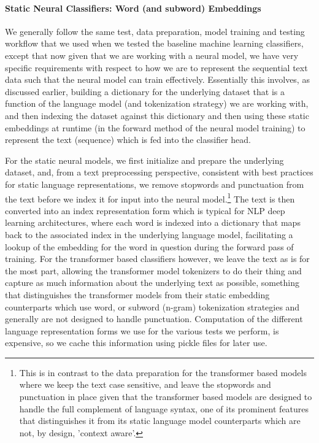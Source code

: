 \documentclass[final]{clv2025-revised}
\begin{document}
\paragraph{Static Neural Classifiers: Word (and subword) Embeddings}
We generally follow the same test, data preparation, model training and testing workflow that we used when we tested the baseline machine learning classifiers, except that now given that we are working with a neural model, we have very specific requirements with respect to how we are to represent the sequential text data such that the neural model can train effectively. Essentially this involves, as discussed earlier, building a dictionary for the underlying dataset that is a function of the language model (and tokenization strategy) we are working with, and then indexing the dataset against this dictionary and then using these static embeddings at runtime (in the forward method of the neural model training) to represent the text (sequence) which is fed into the classifier head.

For the static neural models, we first initialize and prepare the underlying dataset, and, from a text preprocessing perspective, consistent with best practices for static language representations, we remove stopwords and punctuation from the text before we index it for input into the neural model.\footnote{This is in contrast to the data preparation for the transformer based models where we keep the text case sensitive, and leave the stopwords and punctuation in place given that the transformer based models are designed to handle the full complement of language syntax, one of its prominent features that distinguishes it from its static language model counterparts which are not, by design, 'context aware'.} The text is then converted into an index representation form which is typical for NLP deep learning architectures, where each word is indexed into a dictionary that maps back to the associated index in the underlying language model, facilitating a lookup of the embedding for the word in question during the forward pass of training. For the transformer based classifiers however, we leave the text as is for the most part, allowing the transformer model tokenizers to do their thing and capture as much information about the underlying text as possible, something that distinguishes the transformer models from their static embedding counterparts which use word, or subword (n-gram) tokenization strategies and generally are not designed to handle punctuation. Computation of the different language representation forms we use for the various tests we perform, is expensive, so we cache this information using pickle files for later use. 
\end{document}
